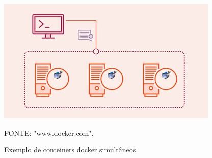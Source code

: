 \begin{figure}[H]
  \centering
  \includegraphics[keepaspectratio=true,scale=0.8] {Figuras/coneiner.jpg}
  \caption{Exemplo de conteiners docker simultâneos} 
 { \footnotesize FONTE: "www.docker.com".} 
  \label{fig:docker}
\end{figure}